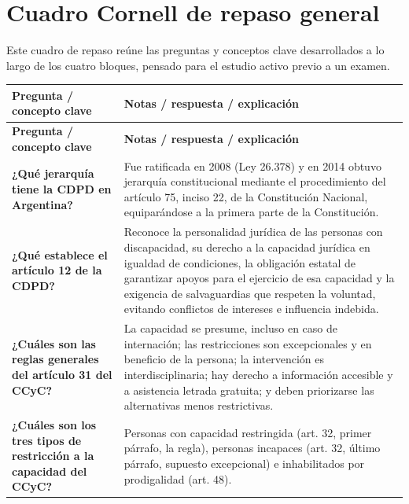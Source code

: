 \documentclass[12pt,oneside]{book}
\begin{document}
\chapter{Cuadro Cornell de repaso general}
\label{ch:cornell-general}

Este cuadro de repaso reúne las preguntas y conceptos clave desarrollados a lo largo de los cuatro bloques, pensado para el estudio activo previo a un examen.

\begin{longtable}{
    >{\raggedright\arraybackslash}p{}
    >{\raggedright\arraybackslash}p{}
}
\toprule
\textbf{Pregunta / concepto clave} & \textbf{Notas / respuesta / explicación} \\
\midrule
\endfirsthead
\toprule
\textbf{Pregunta / concepto clave} & \textbf{Notas / respuesta / explicación} \\
\midrule
\endhead

\textbf{¿Qué jerarquía tiene la CDPD en Argentina?} &
Fue ratificada en 2008 (Ley 26.378) y en 2014 obtuvo jerarquía constitucional mediante el procedimiento del artículo 75, inciso 22, de la Constitución Nacional, equiparándose a la primera parte de la Constitución. \\[0.4em]

\textbf{¿Qué establece el artículo 12 de la CDPD?} &
Reconoce la personalidad jurídica de las personas con discapacidad, su derecho a la capacidad jurídica en igualdad de condiciones, la obligación estatal de garantizar apoyos para el ejercicio de esa capacidad y la exigencia de salvaguardias que respeten la voluntad, evitando conflictos de intereses e influencia indebida. \\[0.4em]

\textbf{¿Cuáles son las reglas generales del artículo 31 del CCyC?} &
La capacidad se presume, incluso en caso de internación; las restricciones son excepcionales y en beneficio de la persona; la intervención es interdisciplinaria; hay derecho a información accesible y a asistencia letrada gratuita; y deben priorizarse las alternativas menos restrictivas. \\[0.4em]

\textbf{¿Cuáles son los tres tipos de restricción a la capacidad del CCyC?} &
Personas con capacidad restringida (art. 32, primer párrafo, la regla), personas incapaces (art. 32, último párrafo, supuesto excepcional) e inhabilitados por prodigalidad (art. 48). \\[0.4em]


\end{longtable}
\end{document}
